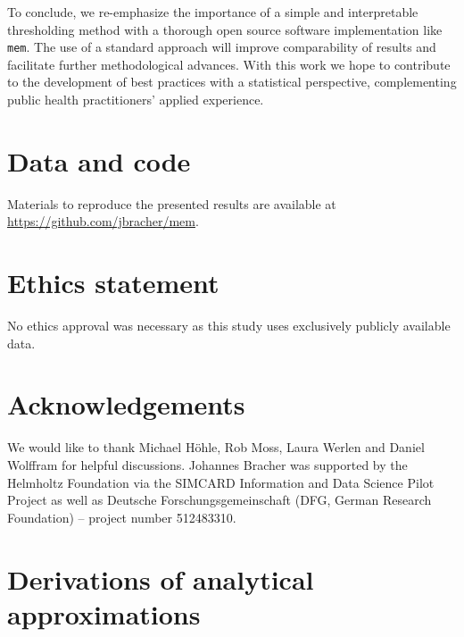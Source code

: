 \documentclass{article}
\begin{document}
To conclude, we re-emphasize the importance of a simple and interpretable thresholding method with a thorough open source software implementation like \texttt{mem}. The use of a standard approach will improve comparability of results and facilitate further methodological advances. With this work we hope to contribute to the development of best practices  with a statistical perspective, complementing public health practitioners' applied experience.


\section*{Data and code}

Materials to reproduce the presented results are available at \url{https://github.com/jbracher/mem}.

\section*{Ethics statement}

No ethics approval was necessary as this study uses exclusively publicly available data.





\section*{Acknowledgements}

We would like to thank Michael H\"ohle, Rob Moss, Laura Werlen and Daniel Wolffram for helpful discussions. Johannes Bracher was supported by the Helmholtz Foundation via the SIMCARD Information and Data Science Pilot Project as well as Deutsche Forschungsgemeinschaft (DFG, German Research Foundation) -- project number 512483310.

{\footnotesize


}

\appendix

\section{Derivations of analytical approximations}
\label{appendix:derivations}
\end{document}
